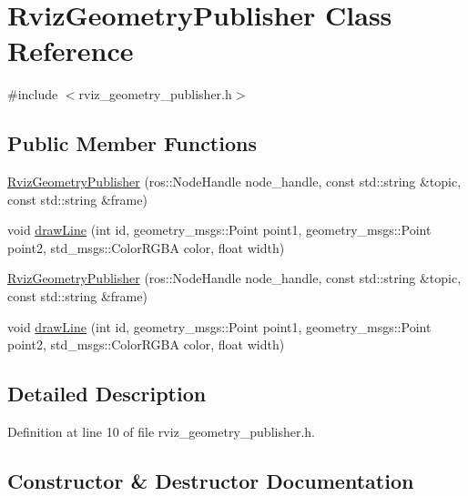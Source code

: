 \hypertarget{class_rviz_geometry_publisher}{}\section{Rviz\+Geometry\+Publisher Class Reference}
\label{class_rviz_geometry_publisher}


{\ttfamily \#include $<$rviz\+\_\+geometry\+\_\+publisher.\+h$>$}

\subsection*{Public Member Functions}
\begin{DoxyCompactItemize}
\item 
\hyperlink{class_rviz_geometry_publisher_ace4d6e2e5dd88168dd4e6c5f528a255e}{Rviz\+Geometry\+Publisher} (ros\+::\+Node\+Handle node\+\_\+handle, const std\+::string \&topic, const std\+::string \&frame)
\item 
void \hyperlink{class_rviz_geometry_publisher_a4448e349606332f087c4deda0a710032}{draw\+Line} (int id, geometry\+\_\+msgs\+::\+Point point1, geometry\+\_\+msgs\+::\+Point point2, std\+\_\+msgs\+::\+Color\+R\+G\+BA color, float width)
\item 
\hyperlink{class_rviz_geometry_publisher_ace4d6e2e5dd88168dd4e6c5f528a255e}{Rviz\+Geometry\+Publisher} (ros\+::\+Node\+Handle node\+\_\+handle, const std\+::string \&topic, const std\+::string \&frame)
\item 
void \hyperlink{class_rviz_geometry_publisher_a4448e349606332f087c4deda0a710032}{draw\+Line} (int id, geometry\+\_\+msgs\+::\+Point point1, geometry\+\_\+msgs\+::\+Point point2, std\+\_\+msgs\+::\+Color\+R\+G\+BA color, float width)
\end{DoxyCompactItemize}


\subsection{Detailed Description}


Definition at line 10 of file rviz\+\_\+geometry\+\_\+publisher.\+h.



\subsection{Constructor \& Destructor Documentation}
